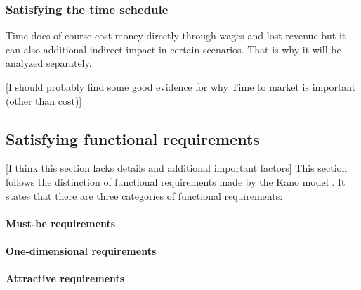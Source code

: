 \subsubsection{Satisfying the time schedule}
Time does of course cost money directly through wages and lost revenue but it can also additional indirect impact in certain scenarios. That is why it will be analyzed separately.

[I should probably find some good evidence for why Time to market is important (other than cost)]
\subsection{Satisfying functional requirements}
[I think this section lacks details and additional important factors]
This section follows the distinction of functional requirements made by the  Kano model \autocite{KanoNoriaki.1984}. 
It states that there are three categories of functional requirements: 
\paragraph{Must-be requirements}  \autocite{ElmarSauerwein.1996}

\paragraph{One-dimensional requirements} \autocite{ElmarSauerwein.1996} 

\paragraph{Attractive requirements} \autocite{ElmarSauerwein.1996}

\begin{comment}
In projects that consist purely of software, customer dissatisfaction is the only negative factor. Projects that also require custom hardware have an additional cost. The hardware already needs to implement every functionality and all manufactured devices need to support it. If the feature is then not implemented the hardware costs more without offering the benefits.
\end{comment}

